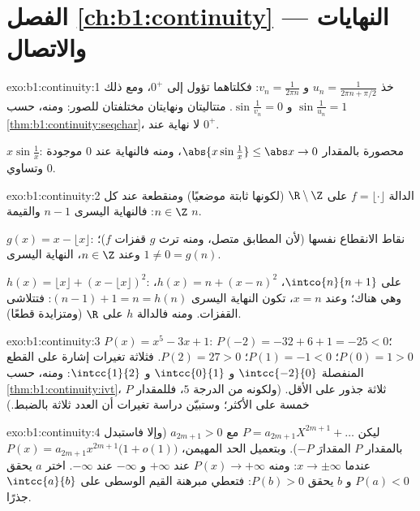 \section*{الفصل \ref{ch:b1:continuity} --- النهايات والاتصال}

\begin{solution}{exo:b1:continuity:1}
خذ $u_n = \frac{1}{2\pi n + \pi/2}$ و $v_n = \frac{1}{2\pi n}$:
فكلتاهما تؤول إلى $0^+$، ومع ذلك $\sin\frac{1}{u_n} = 1$ و
$\sin\frac{1}{v_n} = 0$. متتاليتان ونهايتان مختلفتان
للصور: ومنه، حسب \cref{thm:b1:continuity:seqchar}، لا نهاية عند $0^+$.

$x \sin\frac1x$: محصورة بالمقدار $\abs{x\sin\frac1x} \leq \abs x \to 0$،
ومنه فالنهاية عند $0$ موجودة وتساوي $0$.
\end{solution}

\begin{solution}{exo:b1:continuity:2}
الدالة $f = \lfloor\cdot\rfloor$  على $\R \setminus \Z$
(لكونها ثابتة موضعيًا) ومنقطعة عند كل $n \in \Z$: فالنهاية اليسرى
$n - 1$ والقيمة $n$.

$g(x) = x - \lfloor x\rfloor$: نقاط الانقطاع نفسها (لأن
 المطابق متصل، ومنه ترث $g$ قفزات $f$)؛ وعند $n \in
\Z$، النهاية اليسرى $1 \neq 0 = g(n)$.

$h(x) = \lfloor x\rfloor + (x - \lfloor x\rfloor)^2$: على $\intco{n}{n
+ 1}$، $h(x) = n + (x - n)^2$، وهي  هناك؛ وعند $x = n$، تكون النهاية
اليسرى $(n-1) + 1 = n = h(n)$: فتتلاشى القفزات. ومنه فالدالة $h$ 
على $\R$ (ومتزايدة قطعًا).
\end{solution}

\begin{solution}{exo:b1:continuity:3}
$P(x) = x^5 - 3x + 1$: $P(-2) = -32 + 6 + 1 = -25 < 0$؛ $P(0) = 1 >
0$؛ $P(1) = -1 < 0$؛ $P(2) = 27 > 0$. فثلاثة تغيرات إشارة على
القطع المنفصلة $\intcc{-2}{0}$ و $\intcc{0}{1}$ و $\intcc{1}{2}$:
ومنه، حسب \cref{thm:b1:continuity:ivt}، ثلاثة جذور على الأقل. (ولكونه من
الدرجة $5$، فللمقدار $P$ خمسة على الأكثر؛ وستبيّن دراسة تغيرات
أن العدد ثلاثة بالضبط.)
\end{solution}

\begin{solution}{exo:b1:continuity:4}
ليكن $P = a_{2m+1}X^{2m+1} + \dots$ مع $a_{2m+1} > 0$ (وإلا فاستبدل
بالمقدار $P$ المقدارَ $-P$). وبتعميل الحد المهيمن، $P(x) = a_{2m+1}
x^{2m+1}\bigl(1 + o(1)\bigr)$ عندما $x \to \pm\infty$: ومنه $P(x) \to
+\infty$ عند $+\infty$ و $-\infty$ عند $-\infty$. اختر $a$ يحقق
$P(a) < 0$ و $b$ يحقق $P(b) > 0$: فتعطي مبرهنة القيم الوسطى على
$\intcc{a}{b}$ جذرًا.
\end{solution}

